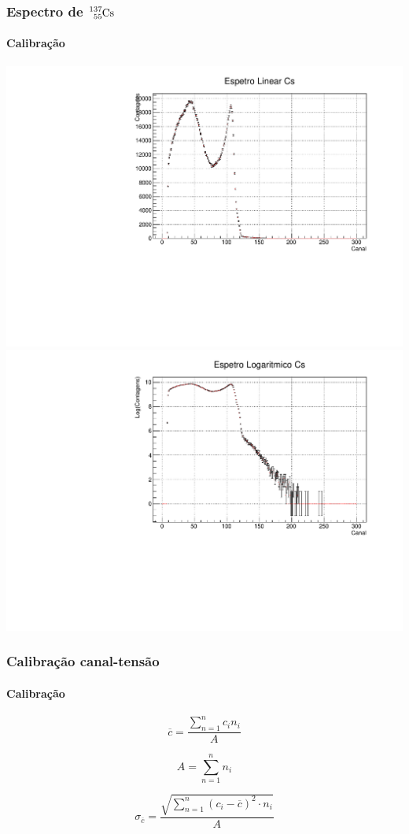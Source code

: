 \documentclass[10pt]{beamer}
\begin{document}
\begin{frame}

\frametitle{Espectro de $\ce{^{137}_{55}Cs}$}\framesubtitle{Calibração}

   \centering
   \includegraphics[scale=0.25]{esplincs.pdf}
   \includegraphics[scale=0.25]{esplogcs.pdf}

\end{frame}


\begin{frame}\frametitle{Calibração canal-tensão}\framesubtitle{Calibração}

\begin{equation}
\overline{c}=\frac{\sum\limits_{n=1}^n c_{i}n_{i}}{A}
\label{centroide}
\end{equation}


\begin{equation}
A=\sum\limits_{n=1}^n n_{i}
\end{equation}


\begin{equation}
\sigma_{\overline{c}}=\frac{\sqrt{\sum\limits_{n=1}^n (c_{i}-\overline{c})^2 \cdot n_{i}    }}{A}
\label{e_centroide}
\end{equation}

\end{frame}
\end{document}
